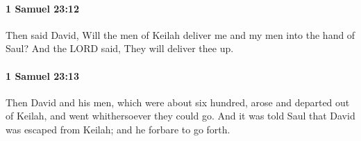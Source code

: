 		\paragraph{1 Samuel 23:12} %
			\label{1SAMUEL-23-12}

			Then said David, Will the men of Keilah deliver me and my men into the hand of Saul? And the LORD said, They will deliver thee up.


		\paragraph{1 Samuel 23:13} %
			\label{1SAMUEL-23-13}

			Then David and his men, which were about six hundred, arose and departed out of Keilah, and went whithersoever they could go. And it was told Saul that David was escaped from Keilah; and he forbare to go forth.


